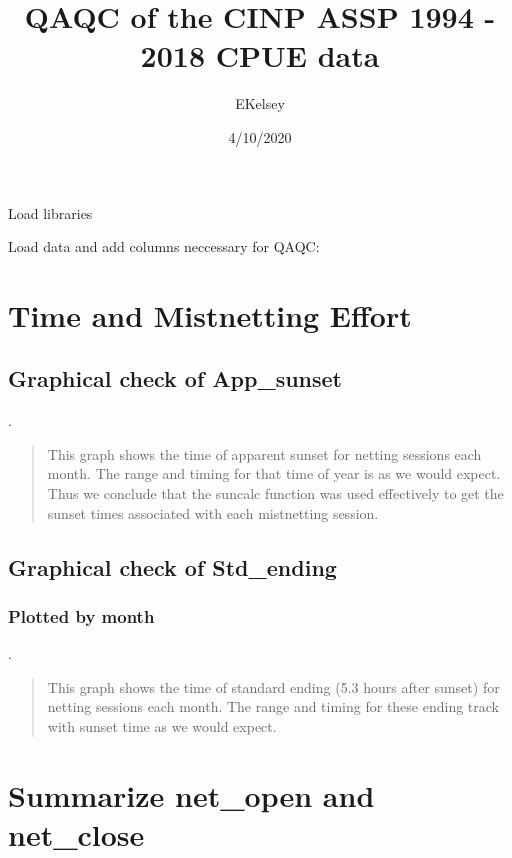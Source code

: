 \documentclass[
]{article}
\title{QAQC of the CINP ASSP 1994 - 2018 CPUE data}
\author{EKelsey}
\date{4/10/2020}
\begin{document}
\maketitle

Load libraries

Load data and add columns neccessary for QAQC:

\hypertarget{time-and-mistnetting-effort}{%
\section{Time and Mistnetting
Effort}\label{time-and-mistnetting-effort}}

\hypertarget{graphical-check-of-app_sunset}{%
\subsection{Graphical check of
App\_sunset}\label{graphical-check-of-app_sunset}}

.

\begin{quote}
This graph shows the time of apparent sunset for netting sessions each
month. The range and timing for that time of year is as we would expect.
Thus we conclude that the suncalc function was used effectively to get
the sunset times associated with each mistnetting session.
\end{quote}

\hypertarget{graphical-check-of-std_ending}{%
\subsection{Graphical check of
Std\_ending}\label{graphical-check-of-std_ending}}

\hypertarget{plotted-by-month}{%
\subsubsection{Plotted by month}\label{plotted-by-month}}

.

\begin{quote}
This graph shows the time of standard ending (5.3 hours after sunset)
for netting sessions each month. The range and timing for these ending
track with sunset time as we would expect.
\end{quote}

\hypertarget{summarize-net_open-and-net_close}{%
\section{Summarize net\_open and
net\_close}\label{summarize-net_open-and-net_close}}
\end{document}
